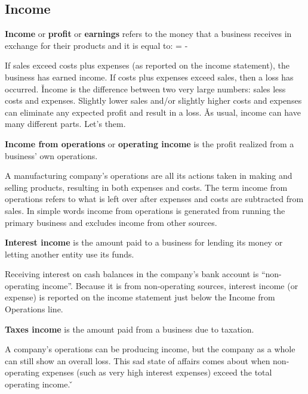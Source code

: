 \subsection{Income}

\textbf{Income} or \textbf{profit} or \textbf{earnings} refers to the money that a business receives in exchange for
their products and it is equal to:
\bse
{} =  - 
\ese
\ed

If sales exceed costs plus expenses (as reported on the income statement), the business has earned income. If costs
plus expenses exceed sales, then a loss has occurred. \v

Income is the difference between two very large numbers: sales less costs and expenses. Slightly lower sales and/or
slightly higher costs and expenses can eliminate any expected profit and result in a loss. \v 

As usual, income can have many different parts. Let's them.

\textbf{Income from operations} or \textbf{operating income} is the profit realized from a business' own operations.
\ed

A manufacturing company's operations are all its actions taken in making and selling products, resulting in both
expenses and costs. The term income from operations refers to what is left over after expenses and costs are
subtracted from sales. In simple words income from operations is generated from running the primary business and
excludes income from other sources.

\textbf{Interest income} is the amount paid to a business for lending its money or letting another entity use its funds.
\ed

Receiving interest on cash balances in the company's bank account is ``non-operating income''. Because it is from
non-operating sources, interest income (or expense) is reported on the income statement just below the Income from
Operations line.

\textbf{Taxes income} is the amount paid from a business due to taxation.
\ed

A company's operations can be producing income, but the company as a whole can still show an overall loss. This sad
state of affairs comes about when non-operating expenses (such as very high interest expenses) exceed the total
operating income. \v

